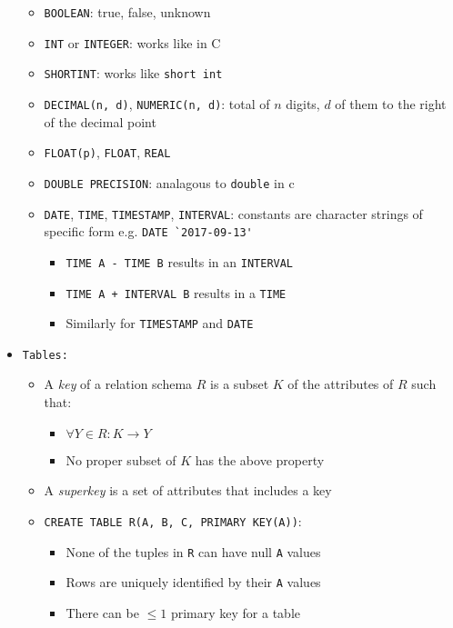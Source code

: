 \documentclass[landscape,8pt]{extarticle}
\newcommand{\code}{\lstinline}
\begin{document}
\begin{multicols}{4}
\begin{itemize}
\begin{itemize}
        \item \code{BOOLEAN}: true, false, unknown
        \item \code{INT} or \code{INTEGER}: works like in C
        \item \code{SHORTINT}: works like \code{short int}
        \item \code{DECIMAL(n, d)}, \code{NUMERIC(n, d)}: total of $n$ digits, $d$ of them to the
        right of the decimal point
        \item \code{FLOAT(p)}, \code{FLOAT}, \code{REAL}
        \item \code{DOUBLE PRECISION}: analagous to \code{double} in c
        \item \code{DATE}, \code{TIME}, \code{TIMESTAMP}, \code{INTERVAL}: constants are character
        strings of specific form e.g. \code{DATE `2017-09-13'}
        \begin{itemize}
            \item \code{TIME A - TIME B} results in an \code{INTERVAL}
            \item \code{TIME A + INTERVAL B} results in a \code{TIME}
            \item Similarly for \code{TIMESTAMP} and \code{DATE}
        \end{itemize}
    \end{itemize}
    \item \code{Tables:} 
    \begin{itemize}
    \item A \emph{key} of a relation schema $R$ is a subset $K$ of the attributes of $R$ such that:
        \begin{itemize}
            \item $\forall Y \in R: K \rightarrow Y$
            \item No proper subset of $K$ has the above property
        \end{itemize}
        \item A \emph{superkey} is a set of attributes that includes a key
        \item \code{CREATE TABLE R(A, B, C, PRIMARY KEY(A))}:
        \begin{itemize}
        \item None of the tuples in \code{R} can have null \code{A} values
        \item Rows are uniquely identified by their \code{A} values
        \item There can be $\leq 1$ primary key for a table
        \end{itemize}

\end{itemize}
\end{itemize}
\end{multicols}
\end{document}
